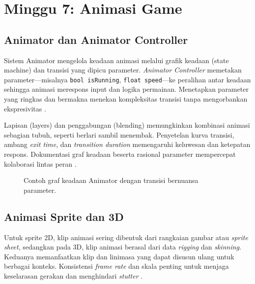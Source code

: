 \documentclass[../main.tex]{subfiles}
\begin{document}
\chapter{Minggu 7: Animasi Game}

\section{Animator dan Animator Controller}
Sistem Animator mengelola keadaan animasi melalui grafik keadaan (state machine) dan transisi yang dipicu parameter. \textit{Animator Controller} memetakan parameter—misalnya \texttt{bool isRunning}, \texttt{float speed}—ke peralihan antar keadaan sehingga animasi merespons input dan logika permainan. Menetapkan parameter yang ringkas dan bermakna menekan kompleksitas transisi tanpa mengorbankan ekspresivitas \parencite{unity-animator,unity-state-machines}.

Lapisan (layers) dan penggabungan (blending) memungkinkan kombinasi animasi sebagian tubuh, seperti berlari sambil menembak. Penyetelan kurva transisi, ambang \textit{exit time}, dan \textit{transition duration} memengaruhi keluwesan dan ketepatan respons. Dokumentasi graf keadaan beserta rasional parameter mempercepat kolaborasi lintas peran \parencite{unity-animator}.

\begin{figure}[h]
  \centering
  \caption{Contoh graf keadaan Animator dengan transisi bernuansa parameter.}
\end{figure}

\section{Animasi Sprite dan 3D}
Untuk sprite 2D, klip animasi sering dibentuk dari rangkaian gambar atau \textit{sprite sheet}, sedangkan pada 3D, klip animasi berasal dari data \textit{rigging} dan \textit{skinning}. Keduanya memanfaatkan klip dan linimasa yang dapat disusun ulang untuk berbagai konteks. Konsistensi \textit{frame rate} dan skala penting untuk menjaga keselarasan gerakan dan menghindari \textit{stutter} \parencite{unity-animation-clips}.
\end{document}
